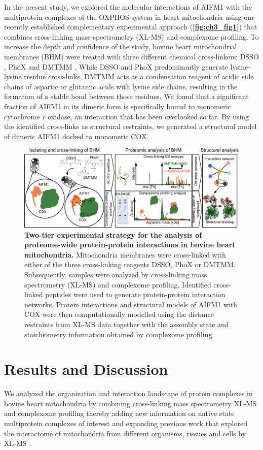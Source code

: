 In the present study, we explored the molecular interactions of AIFM1 with the multiprotein complexes of the OXPHOS system in heart mitochondria using our recently established complementary experimental approach (\textbf{\autoref{fig:ch3_fig1}}) \cite{RN11} that combines cross-linking mass-spectrometry (XL-MS) and complexome profiling. To increase the depth and confidence of the study, bovine heart mitochondrial membranes (BHM) were treated with three different chemical cross-linkers: DSSO \cite{RN12}, PhoX \cite{RN13} and DMTMM \cite{RN14}. While DSSO and PhoX predominantly generate lysine-lysine residue cross-links, DMTMM acts as a condensation reagent of acidic side chains of aspartic or glutamic acids with lysine side chains, resulting in the formation of a stable bond between those residues. We found that a significant fraction of AIFM1 in its dimeric form is specifically bound to monomeric cytochrome \emph{c} oxidase, an interaction that has been overlooked so far. By using the identified cross-links as structural restraints, we generated a structural model of dimeric AIFM1 docked to monomeric COX.
\begin{figure}[htb]
    \center
    \includegraphics[]{Chapter.3/Figures/Figure1.png}
    \caption{\textbf{Two-tier experimental strategy for the analysis of proteome-wide protein-protein interactions in bovine heart mitochondria.} Mitochondria membranes were cross-linked with either of the three cross-linking reagents DSSO, PhoX or DMTMM. Subsequently, samples were analyzed by cross-linking mass spectrometry (XL-MS) and complexome profiling. Identified cross-linked peptides were used to generate protein-protein interaction networks. Protein interactions and structural models of AIFM1 with COX were then computationally modelled using the distance restraints from XL-MS data together with the assembly state and stoichiometry information obtained by complexome profiling.}
    \label{fig:ch3_fig1}
\end{figure}
%
\section{Results and Discussion}
We analyzed the organization and interaction landscape of protein complexes in bovine heart mitochondria by combining cross-linking mass spectrometry XL-MS and complexome profiling \cite{RN15, RN11} thereby adding new information on native state multiprotein complexes of interest and expanding previous work that explored the interactome of mitochondria from different organisms, tissues and cells by XL-MS \cite{RN20, RN18, RN16, RN19, RN17}.
%

